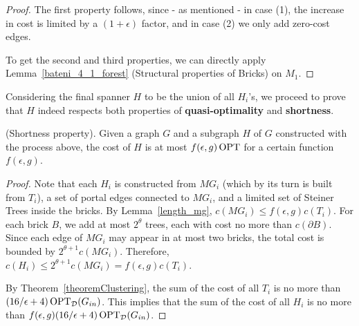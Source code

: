 \begin{proof}
    The first property follows, since - as mentioned - in case (1), the increase in cost is limited by a \((1 + \epsilon)\) factor, and in case (2) we only add zero-cost edges.
    
    To get the second and third properties, we can directly apply Lemma~\ref{bateni_4_1_forest} (Structural properties of Bricks) on \(M_1\). 
\end{proof}

Considering the final spanner \(H\) to be the union of all \(H_i\)'s, we proceed to prove that \(H\) indeed respects both properties of \textbf{quasi-optimality} and \textbf{shortness}.

\begin{flemma}{{(Shortness property).}}\label{spanner_shortness_property} Given a graph \(G\) and a subgraph \(H\) of \(G\) constructed with the process above, the cost of \(H\) is at most \(f(\epsilon, g) \operatorname{\textrm{OPT}}\) for a certain function
\(f(\epsilon, g)\).
\end{flemma}
\begin{proof}
Note that each \(H_i\) is constructed from \(MG_i\) (which by its turn is built from \(T_i\)), a set of portal edges connected to \(MG_i\), and a limited set of Steiner Trees inside the bricks. By Lemma~\ref{length_mg}, \(c(MG_i) \leq f(\epsilon, g) c(T_i)\). For each brick \(B\), we add at most \(2^{\theta}\) trees, each with cost no more than \(c(\partial B)\). Since each edge of \(MG_i\) may appear in at most two bricks, the total cost is bounded by \(2^{\theta + 1} c(MG_i)\). Therefore, \(c(H_i) \leq 2^{\theta + 1} c(MG_i) = f(\epsilon, g) c(T_i)\).

By Theorem~\ref{theoremClustering}, the sum of the cost of all \(T_i\) is no more than \((16/\epsilon + 4) \operatorname{\textrm{OPT}}_{\mathcal{D}}(G_{in})\).
This implies that the sum of the cost of all \(H_i\) is no more than \(f(\epsilon, g) (16/\epsilon + 4) \operatorname{\textrm{OPT}}_{\mathcal{D}}(G_{in})\).
\end{proof}

